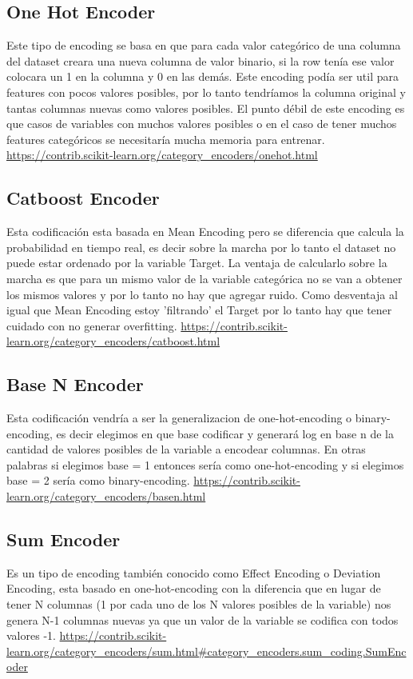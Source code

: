 \documentclass[12pt,a4paper]{article}
\begin{document}
\subsection{One Hot Encoder}
Este tipo de encoding se basa en que para cada valor categórico de una columna del dataset creara una nueva columna de valor binario, si la row tenía ese valor colocara un 1 en la columna y 0 en las demás. Este encoding podía ser util para features con pocos valores posibles, por lo tanto tendríamos la columna original y tantas columnas nuevas como valores posibles. El punto débil de este encoding es que casos de variables con muchos valores posibles o en el caso de tener muchos features categóricos se necesitaría mucha memoria para entrenar.
\url{https://contrib.scikit-learn.org/category_encoders/onehot.html}

\subsection{Catboost Encoder}
Esta codificación esta basada en Mean Encoding pero se diferencia que calcula la probabilidad en tiempo real, es decir sobre la marcha por lo tanto el dataset no puede estar ordenado por la variable Target. La ventaja de calcularlo sobre la marcha es que para un mismo valor de la variable categórica no se van a obtener los mismos valores y por lo tanto no hay que agregar ruido. Como desventaja al igual que Mean Encoding estoy 'filtrando' el Target por lo tanto hay que tener cuidado con no generar overfitting.
\url{https://contrib.scikit-learn.org/category_encoders/catboost.html}

\subsection{Base N Encoder}
Esta codificación vendría a ser la generalizacion de one-hot-encoding o binary-encoding, es decir elegimos en que base codificar y generará log en base n de la cantidad de valores posibles de la variable a encodear columnas. En otras palabras si elegimos base = 1 entonces sería como one-hot-encoding y si elegimos base = 2 sería como binary-encoding.
\url{https://contrib.scikit-learn.org/category_encoders/basen.html}

\subsection{Sum Encoder}
Es un tipo de encoding también conocido como Effect Encoding o Deviation Encoding, esta basado en one-hot-encoding con la diferencia que en lugar de tener N columnas (1 por cada uno de los N valores posibles de la variable) nos genera N-1 columnas nuevas ya que un valor de la variable se codifica con todos valores -1.
\url{https://contrib.scikit-learn.org/category_encoders/sum.html#category_encoders.sum_coding.SumEncoder}
\end{document}
